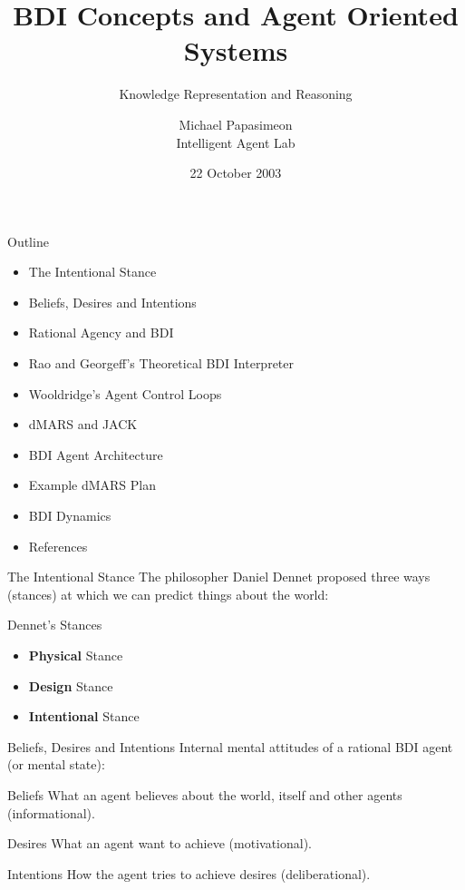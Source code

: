 \documentclass[aspectratio=1610,xcolor=dvipsnames,t]{beamer}
\title[BDI Concepts]{BDI Concepts and Agent Oriented Systems}
\subtitle{Knowledge Representation and Reasoning}
\author[Michael Papasimeon]{Michael Papasimeon \\[0.2cm] \tiny{Intelligent Agent Lab} }
\date{22 October 2003}
\begin{document}
\begin{frame}
    \maketitle
\end{frame} 

\begin{frame}{Outline} 
    \begin{itemize}
        \item The Intentional Stance
        \item Beliefs, Desires and Intentions
        \item Rational Agency and BDI
        \item Rao and Georgeff's Theoretical BDI Interpreter
        \item Wooldridge's Agent Control Loops
        \item dMARS and JACK
        \item BDI Agent Architecture
        \item Example dMARS Plan
        \item BDI Dynamics
        \item References
    \end{itemize} 
\end{frame} 

\begin{frame}{The Intentional Stance} 
    The philosopher Daniel Dennet proposed three ways (stances) at which
    we can predict things about the world:
    \begin{block}{Dennet's Stances} 
        \begin{itemize} 
            \item \textbf{Physical} Stance
            \item \textbf{Design} Stance
            \item \textbf{Intentional} Stance
        \end{itemize} 
    \end{block} 
\end{frame} 

\begin{frame}{Beliefs, Desires and Intentions} 
    Internal mental attitudes of a rational BDI agent (or mental state):
    \begin{block}{Beliefs} 
        What an agent believes about the world, itself and other agents
        (informational).
    \end{block} 
    \begin{block}{Desires} 
        What an agent want to achieve (motivational).
    \end{block} 
    \begin{block}{Intentions} 
        How the agent tries to achieve desires (deliberational).
    \end{block} 
\end{frame} 
\end{document}
